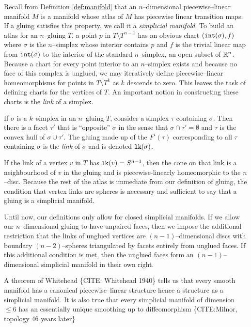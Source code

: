 Recall from Definition \ref{def:manifold} that an $n$--dimensional piecewise--linear manifold $M$ is a manifold whose atlas of $M$ has piecewise linear transition maps.
If a gluing satisfies this property, we call it a \emph{simplicial manifold}.
To build an atlas for an $n$--gluing $T$, a point $p$ in $T\setminus T^{n-1}$ has an obvious chart $(\mathtt{int}(\sigma),f)$ where $\sigma$ is the $n$--simplex whose interior contains $p$ and $f$ is the trivial linear map from $\mathtt{int}(\sigma)$ to the interior of the standard $n$--simplex, an open subset of $\mathbb{R}^n$.
Because a chart for every point interior to an $n$--simplex exists and because no face of this complex is unglued, we may iteratively define piecewise--linear homeomorphisms for points in $T\setminus T^{k}$ as $k$ descends to zero.
This leaves the task of defining charts for the vertices of $T$.
An important notion in constructing these charts is the \emph{link} of a simplex.

\begin{defn}
  If $\sigma$ is a $k$--simplex in an $n$--gluing $T$, consider a simplex $\tau$ containing $\sigma$.  
  Then there is a facet $\tau'$ that is ``opposite'' $\sigma$ in the sense that $\sigma\cap \tau'=\emptyset$ and $\tau$ is the convex hull of $\sigma\cup \tau'$.
  The gluing made up of the $F^i(\tau)$ corresponding to all $\tau$ containing $\sigma$ is the \emph{link} of $\sigma$ and is denoted $\texttt{lk}(\sigma)$.
\end{defn}

If the link of a vertex $v$ in $T$ has $\texttt{lk}(v)=S^{n-1}$, then the cone on that link is a neighbourhood of $v$ in the gluing and is piecewise-linearly homeomorphic to the $n$--disc.
Because the rest of the atlas is immediate from our definition of gluing, the condition that vertex links are spheres is necessary and sufficient to say that a gluing is a simplicial manifold.

Until now, our definitions only allow for closed simplicial manifolds.
If we allow our $n$--dimensional gluing to have unpaired faces, then we impose the additional restriction that the links of unglued vertices are $(n-1)$--dimensional discs with boundary $(n-2)$--spheres triangulated by facets entirely from unglued faces.
If this additional condition is met, then the unglued faces form an $(n-1)$--dimensional simplicial manifold in their own right.

A theorem of Whitehead \{CITE: Whitehead 1940\} tells us that every smooth manifold has a canonical piecewise--linear structure hence a structure as a simplicial manifold.
It is also true that every simplicial manifold of dimension $\leq 6$ has an essentially unique smoothing up to diffeomorphism \{CITE:Milnor, topology 46 years later\}
